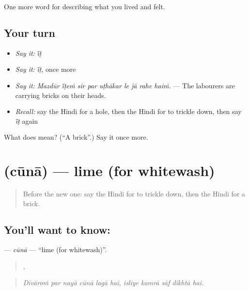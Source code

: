 \begin{grammarlens}[title={What you've built}]
One more word for describing what you lived and felt.
\end{grammarlens}

\subsection*{Your turn}
\begin{itemize}
\raggedright
  \item \emph{Say it:} \emph{ī̃ṭ}
  \item \emph{Say it:} \emph{ī̃ṭ}, once more
  \item \emph{Say it:} \emph{Mazdūr ī̃ṭeṁ sir par uṭhākar le jā rahe haiṁ.} — The labourers are carrying bricks on their heads.
  \item \emph{Recall:} say the Hindi for a hole, then the Hindi for to trickle down, then say \emph{ī̃ṭ} again
\end{itemize}

\begin{tcolorbox}[breakable,colback=teal!4,colframe=teal!35!black,title={Before you move on}]
What does  mean? (\textquotedblleft{}A brick\textquotedblright{}.) Say it once more.
\end{tcolorbox}
\section[\texorpdfstring{\hi{चूना} (cūnā)}{चूना (cūnā)}]{ (cūnā) — lime (for whitewash)}

\label{lesson:HI-C517-cuna}



\begin{quote}
Before the new one: say the Hindi for to trickle down, then the Hindi for a brick.
\end{quote}

\subsection*{You'll want to know: }
\textbf{} — \emph{cūnā} — \textquotedblleft{}lime (for whitewash)\textquotedblright{}.

\begin{quote}
     ,     
\end{quote}

\begin{quote}
\emph{Dīvāroṁ par nayā cūnā lagā hai, isliye kamrā sāf dikhtā hai.}
\end{quote}

